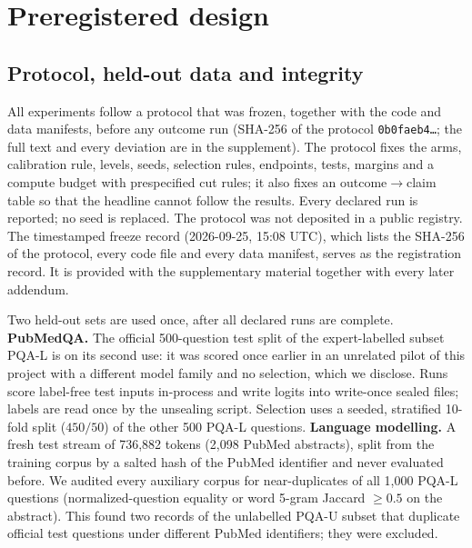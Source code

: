 \section{Preregistered design}\label{sec:design}

\subsection{Protocol, held-out data and integrity}
All experiments follow a protocol that was frozen, together with the code and data manifests,
before any outcome run (SHA-256 of the protocol \texttt{0b0faeb4\ldots}; the full text and every
deviation are in the supplement). The protocol fixes the arms, calibration rule, levels, seeds,
selection rules, endpoints, tests, margins and a compute budget with prespecified cut rules; it
also fixes an outcome$\to$claim table so that the headline cannot follow the results. Every declared
run is reported; no seed is replaced. The protocol was not deposited in a public registry. The
timestamped freeze record (2026-09-25, 15:08 UTC), which lists the SHA-256 of the protocol, every code
file and every data manifest, serves as the registration record. It is provided with the supplementary
material together with every later addendum.

Two held-out sets are used once, after all declared runs are complete. \textbf{PubMedQA.} The official
500-question test split of the expert-labelled subset PQA-L \citep{jin2019pubmedqa} is on its second use:
it was scored once earlier in an unrelated pilot of this project with a different model family and no
selection, which we disclose. Runs score label-free test inputs in-process and write logits into
write-once sealed files; labels are read once by the unsealing script. Selection uses a seeded,
stratified 10-fold split ($450/50$) of the other 500 PQA-L questions. \textbf{Language modelling.} A fresh
test stream of 736{,}882 tokens (2{,}098 PubMed abstracts), split from the training corpus by a salted
hash of the PubMed identifier and never evaluated before. We audited every auxiliary corpus for
near-duplicates of all 1{,}000 PQA-L questions (normalized-question equality or word 5-gram Jaccard
$\ge0.5$ on the abstract). This found two records of the unlabelled PQA-U subset that duplicate
official test questions under different PubMed identifiers; they were excluded.


